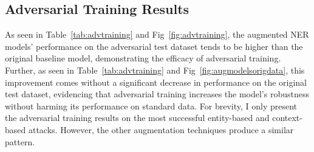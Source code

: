 \subsection{Adversarial Training Results}
As seen in Table~\ref{tab:advtraining} and Fig~\ref{fig:advtraining}, the augmented NER models' performance on the adversarial test dataset tends to be higher than the original baseline model, demonstrating the efficacy of adversarial training. Further, as seen in Table~\ref{tab:advtraining} and Fig~\ref{fig:augmodelsorigdata}, this improvement comes without a significant decrease in performance on the original test dataset, evidencing that adversarial training increases the model's robustness without harming its performance on standard data. For brevity, I only present the adversarial training results on the most successful entity-based and context-based attacks. However, the other augmentation techniques produce a similar pattern.

\newpage

